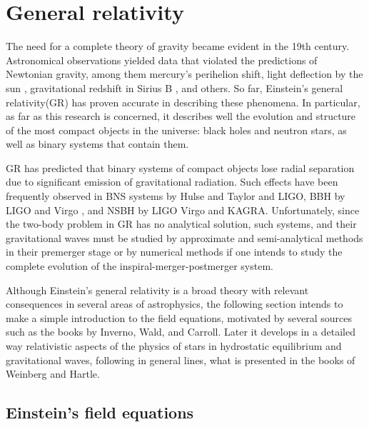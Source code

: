 \section{General relativity}

The need for a complete theory of gravity became evident in the 19th century. Astronomical observations yielded data that violated the predictions of Newtonian gravity, among them mercury's perihelion shift\cite{1859AnPar...5....1L}, light deflection by the sun \cite{1920RSPTA.220..291D}, gravitational redshift in Sirius B \cite{2010JHA....41...41H}, and others. So far, Einstein's general relativity(GR) has proven accurate in describing these phenomena. In particular, as far as this research is concerned, it describes well the evolution and structure of the most compact objects in the universe: black holes and neutron stars, as well as binary systems that contain them.

GR has predicted that binary systems of compact objects lose radial separation due to significant emission of gravitational radiation. Such effects have been frequently observed in BNS systems by Hulse and Taylor \cite{Weisberg:1981mt} and LIGO\cite{LIGOScientific:2017vwq}, BBH by LIGO and Virgo \cite{LIGOScientific:2016aoc}, and NSBH by LIGO Virgo and KAGRA\cite{LIGOScientific:2021qlt}. Unfortunately, since the two-body problem in GR has no analytical solution, such systems, and their gravitational waves must be studied by approximate and semi-analytical methods in their premerger stage or by numerical methods if one intends to study the complete evolution of the inspiral-merger-postmerger system\cite{Dietrich:2018phi}.

Although Einstein's general relativity is a broad theory with relevant consequences in several areas of astrophysics, the following section intends to make a simple introduction to the field equations, motivated by several sources such as the books by Inverno\cite{inverno}, Wald\cite{Wald:1984rg}, and Carroll\cite{carroll-notes}. Later it develops in a detailed way relativistic aspects of the physics of stars in hydrostatic equilibrium and gravitational waves, following in general lines, what is presented in the books of Weinberg\cite{Weinberg:1972kfs} and Hartle\cite{Hartle:2021pel}.



\subsection{Einstein's field equations}

